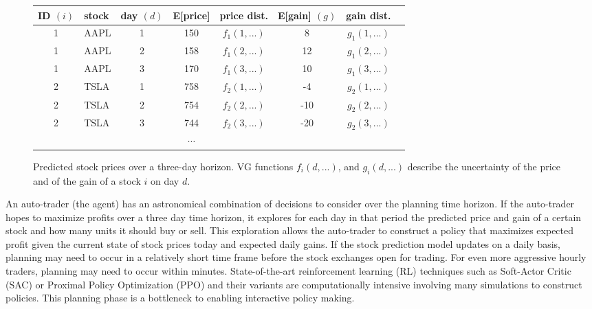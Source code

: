 \documentclass[11pt]{article}
\newcommand{\attr}[1]{{\sf #1}}
\begin{document}
\setlength\intextsep{0pt}
\begin{figure}
\centering
{\small
\begin{tabular}{clcccccc}
\attr{ID} $(i)$ & \attr{stock} & \attr{day} $(d)$ & \attr{E[price]} & \attr{price dist.} & \attr{E[gain]} $(g)$ & \attr{gain dist.}\\
\hline
1  & AAPL  & 1 & 150 & $f_1(1, ...)$ & 8 & $g_1(1, ...)$\\
1  & AAPL  & 2 & 158 & $f_1(2, ...)$ & 12 & $g_1(2, ...)$\\
1  & AAPL  & 3 & 170 & $f_1(3, ...)$ & 10 & $g_1(3, ...)$\\
2  & TSLA  & 1 & 758 & $f_2(1, ...)$ & -4 & $g_2(1, ...)$\\
2  & TSLA  & 2 & 754 & $f_2(2, ...)$ & -10 & $g_2(2, ...)$\\
2  & TSLA  & 3 & 744 & $f_2(3, ...)$ & -20 & $g_2(3, ...)$\\
& && $\cdots$  &&\\
\hline
\end{tabular}}
\caption{Predicted stock prices over a three-day horizon. VG functions $f_{i}(d, ...)$, and $g_{i}(d, ...)$ describe the uncertainty of the price and of the gain of a stock $i$ on day $d$.}
\label{tab:30daystock}
\end{figure}

An auto-trader (the agent) has an astronomical combination of decisions to consider over the planning time horizon. If the auto-trader hopes to maximize profits over a three day time horizon, it explores for each day in that period the predicted price and gain of a certain stock and how many units it should buy or sell. This exploration allows the auto-trader to construct a policy that maximizes expected profit given the current state of stock prices today and expected daily gains. If the stock prediction model updates on a daily basis, planning may need to occur in a relatively short time frame before the stock exchanges open for trading. For even more aggressive hourly traders, planning may need to occur within minutes. State-of-the-art reinforcement learning (RL) techniques such as Soft-Actor Critic (SAC) or Proximal Policy Optimization (PPO) and their variants are computationally intensive involving many simulations to construct policies. This planning phase is a bottleneck to enabling interactive policy making. 
\end{document}

